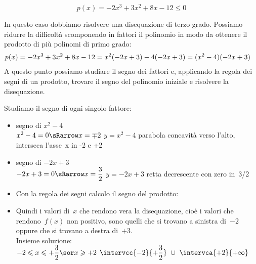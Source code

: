 
\begin{esempio}{}{}
 \[p(x)=-2x^3+3x^2+8x-12 \leqslant 0\]

In questo caso dobbiamo risolvere una disequazione di terzo grado. 
Possiamo ridurre la difficoltà scomponendo in fattori il polinomio in modo da 
ottenere il prodotto di più polinomi di primo grado:
\begin{align*} \small
p(x) = -2x^3+3x^2+8x-12 &= x^2(-2x+3)-4(-2x+3) = (x^2-4)(-2x+3)
\end{align*}
A questo punto possiamo studiare il segno dei fattori e, applicando la regola 
dei segni di un prodotto, trovare il segno del polinomio iniziale e risolvere 
la disequazione.

Studiamo il segno di ogni singolo fattore:
\begin{itemize}

 \item segno di \(x^2-4\)\\
 \segnofatt
   {\(x^2-4=0 \sRarrow x=\mp 2\)}
   {\(y=x^2-4\)}
   {parabola concavità verso l'alto, interseca l'asse~x in -2 e +2}
   {}
 \item  segno di \(-2x+3\)\\
 \segnofatt
   {\(-2x+3=0 \sRarrow x=\dfrac{3}{2}\)}
   {\(y=-2x+3\)}
   {retta decrescente con zero in~3/2}
   {}
 \item 
 \vspace{-1em} 
 Con la regola dei segni calcolo il segno del prodotto:
 \vspace{-1em}

\begin{inaccessibleblock}
  \begin{center}
  \grrsegnoprodottoa
  \end{center}
\end{inaccessibleblock}

 \item 
 \vspace{-1em}
 Quindi i valori di~\(x\) che rendono vera la disequazione, cioè i 
valori che rendono~\(f(x)\) non positivo, sono quelli 
che si trovano a sinistra di~\(-2\) oppure che si trovano a destra 
di~\(+3\).\\
Insieme soluzione: \\
 \insiemesoluzione
   {\solprodottoa}
   {\(-2 \leqslant x \leqslant +\dfrac{3}{2} \sor x \geqslant +2\)}
   {\(\intervcc{-2}{+\dfrac{3}{2}}~\cup~\intervca{+2}{+\infty}\)}
\end{itemize}
\end{esempio}

